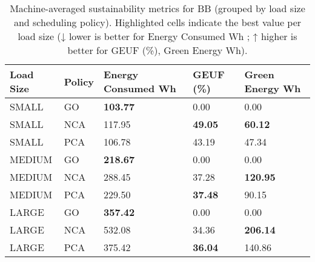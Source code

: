 \newcommand{\highlightcell}[1]{\textbf{#1}}

\begin{table}[h!tbp]
\centering
\caption{Machine-averaged sustainability metrics for BB (grouped by load size and scheduling policy). Highlighted cells indicate the best value per load size (↓ lower is better for Energy Consumed Wh ; ↑ higher is better for GEUF (\%), Green Energy Wh).}
\label{tab:bb_results_summary}
\begin{tabular}{|m{1.8cm}|m{1.5cm}|m{2.0cm}|m{2.0cm}|m{2.0cm}|}
\toprule
Load Size & Policy & Energy Consumed Wh & GEUF (\%) & Green Energy Wh \\
\midrule
SMALL & GO & \highlightcell{103.77} & 0.00 & 0.00 \\
SMALL & NCA & 117.95 & \highlightcell{49.05} & \highlightcell{60.12} \\
SMALL & PCA & 106.78 & 43.19 & 47.34 \\
\midrule
MEDIUM & GO & \highlightcell{218.67} & 0.00 & 0.00 \\
MEDIUM & NCA & 288.45 & 37.28 & \highlightcell{120.95} \\
MEDIUM & PCA & 229.50 & \highlightcell{37.48} & 90.15 \\
\midrule
LARGE & GO & \highlightcell{357.42} & 0.00 & 0.00 \\
LARGE & NCA & 532.08 & 34.36 & \highlightcell{206.14} \\
LARGE & PCA & 375.42 & \highlightcell{36.04} & 140.86 \\
\bottomrule
\end{tabular}
\end{table}
